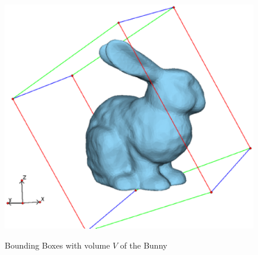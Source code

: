 \documentclass[a4paper,10pt,notitlepage]{scrreprt}
\begin{document}
\begin{figure}
{    \label{fig:bbox-bunny-v3}
    \includegraphics[scale=0.4]{bbox-v3-bunny.eps}}
 \caption{Bounding Boxes with volume $V$ of the Bunny}
 \label{fig:bbox-bunny}
\end{figure}
\end{document}
